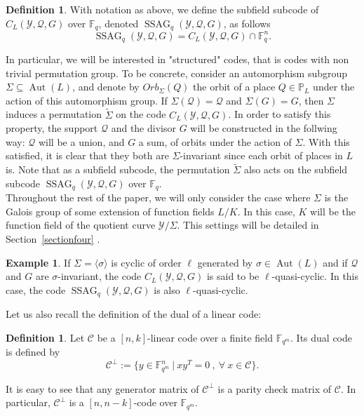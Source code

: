 \documentclass[10pt]{article}
\theoremstyle{definition}
\newtheorem{def1}[thm]{Definition}
\theoremstyle{definition}
\theoremstyle{definition}
\newtheorem{expl}[thm]{Example}
\newcommand{\s}{\vspace{0.3cm}}
\newcommand{\PP}{\mathbb{P}}
\newcommand{\fqm}{\mathbb{F}_{q^m}}
\newcommand{\fq}{\mathbb{F}_q}
\newcommand{\su}{\subseteq}
\newcommand{\Y}{\mathcal{Y}}
\newcommand{\QR}{\mathcal{Q}}
\newcommand{\Aut}{\operatorname{Aut}}
\newcommand{\ssag}{\operatorname{SSAG}}
\begin{document}
\s

\begin{def1}
With notation as above, we define the subfield subcode of $C_L(\Y,\QR,G)$ over $\fq$, denoted $\ssag_q(\Y,\QR,G)$, as follows
\[ \ssag_q(\Y,\QR,G) = C_L(\Y,\QR,G) \cap \fq^n.\]
\end{def1}

\s

In particular, we will be interested in "structured" codes, that is codes with non trivial permutation group. To be concrete, consider an automorphism subgroup $\Sigma \su \Aut(L)$, and denote by $Orb_{\Sigma}(Q)$ the orbit of a place $Q \in \PP_L$ under the action of this automorphism group. If $\Sigma(\QR) = \QR$ and $\Sigma(G)=G$, then $\Sigma$ induces a permutation $\tilde{\Sigma}$ on the code $C_L(\Y,\QR,G)$. In order to satisfy this property, the support $\QR$ and the divisor $G$ will be constructed in the follwing way: $\QR$ will be a union, and $G$ a sum, of orbits under the action of $\Sigma$. With this satisfied, it is clear that they both are $\Sigma$-invariant since each orbit of places in $L$ is. Note that as a subfield subcode, the permutation $\tilde{\Sigma}$ also acts on the subfield subcode $\ssag_q(\Y,\QR,G)$ over $\fq$. \\
\color{purple}
Throughout the rest of the paper, we will only consider the case where $\Sigma$ is the Galois group of some extension of function fields $L/K$. In this case, $K$ will be the function field of the quotient curve $\Y/\Sigma$. This settings will be detailed in Section~\ref{sectionfour}
\color{black}. 


\s

\begin{expl} 
If $\Sigma = \langle\sigma\rangle$ is cyclic of order $\ell$ generated by $\sigma \in \Aut(L)$ and if $\QR$ and $G$ are $\sigma$-invariant, the code $C_L(\Y,\QR,G)$ is said to be $\ell$-quasi-cyclic. In this case, the code $\ssag_q(\Y,\QR,G)$ is also $\ell$-quasi-cyclic.
\end{expl}

\s

Let us also recall the definition of the dual of a linear code:

\s

\begin{def1}
Let $\mathcal{C}$ be a $[n,k]$-linear code over a finite field $\fqm$. Its dual code is defined by 
\[\mathcal{C}^{\perp} := \{ y \in \fqm^n \ | \ xy^T = 0 \ , \ \forall \ x \in \mathcal{C}\}.\]
\end{def1}
It is easy to see that any generator matrix of $\mathcal{C}^{\perp}$ is a parity check matrix of $\mathcal{C}$. In particular, $\mathcal{C}^{\perp}$ is a $[n,n-k]$-code over $\fqm$.
\end{document}
